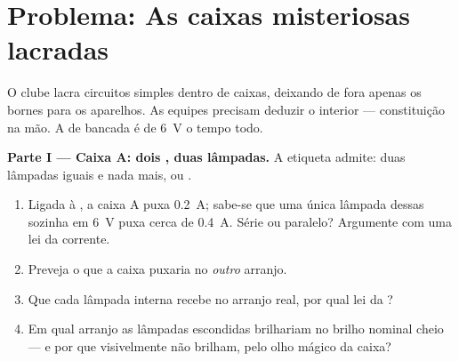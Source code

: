 \section{Problema: As caixas misteriosas lacradas}

\begin{problem}\label{pb:g8:circuit-laws:1}
O clube lacra circuitos simples dentro de caixas, deixando de fora
apenas os bornes para os aparelhos. As equipes precisam deduzir o
interior --- constituição na mão. A  de bancada é de \qty{6}{V}
o tempo todo.

\medskip\noindent\textbf{Parte I --- Caixa A: dois , duas
lâmpadas.}
A etiqueta admite: duas lâmpadas iguais e nada mais,  ou .
\begin{enumerate}
  \item Ligada à , a caixa A puxa \qty{0.2}{A}; sabe-se que uma
        única lâmpada dessas sozinha em \qty{6}{V} puxa cerca de
        \qty{0.4}{A}. Série ou paralelo? Argumente com uma lei da
        corrente.
  \item Preveja o que a caixa puxaria no \emph{outro} arranjo.
  \item Que  cada lâmpada interna recebe no arranjo real, por
        qual lei da ?
  \item Em qual arranjo as lâmpadas escondidas brilhariam no brilho
        nominal cheio --- e por que visivelmente não brilham, pelo
        olho mágico da caixa?
\end{enumerate}


\end{problem}
